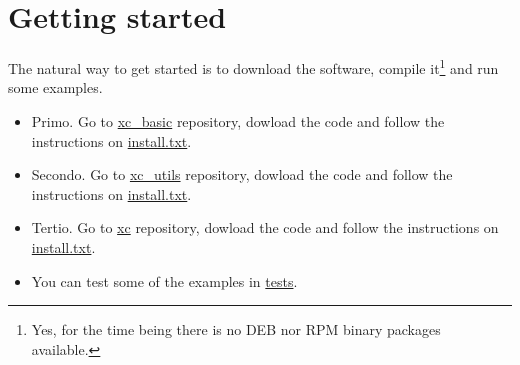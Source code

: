 \section{Getting started}

The natural way to get started is to download the software, compile it\footnote{Yes, for the time being there is no DEB nor RPM binary packages available.} and run some examples.

\begin{itemize}
\item Primo. Go to \href{https://github.com/lcpt/xc_basic}{xc\_basic} repository, dowload the code and follow the instructions on \href{https://github.com/lcpt/xc_basic/blob/master/install.txt}{install.txt}.
\item Secondo. Go to \href{https://github.com/lcpt/xc_utils}{xc\_utils} repository, dowload the code and follow the instructions on \href{https://github.com/lcpt/xc_utils/blob/master/install.txt}{install.txt}.
\item Tertio. Go to \href{https://github.com/lcpt/xc}{xc} repository, dowload the code and follow the instructions on \href{https://github.com/lcpt/xc/blob/master/install.txt}{install.txt}.
\item You can test some of the examples in \href{https://github.com/lcpt/xc/tree/master/verif/tests}{tests}.
\end{itemize}






